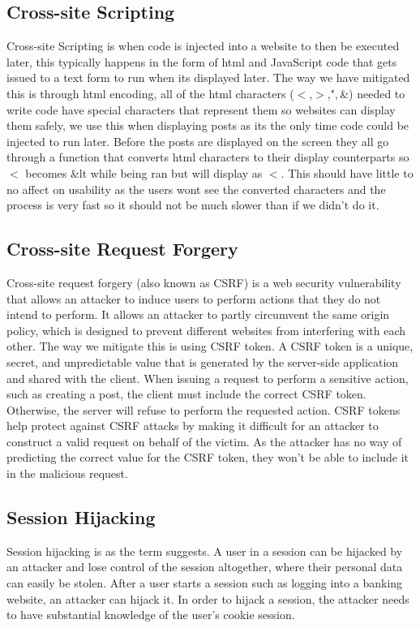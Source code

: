 \documentclass{cmpstyle}
\begin{document}
\subsection{Cross-site Scripting}
Cross-site Scripting is when code is injected into a website to then be executed later, this typically happens in the form of html and JavaScript code that gets issued to a text form to run when its displayed later. The way we have mitigated this is through html encoding, all of the html characters ($<$,$>$,",\,\&) needed to write code have special characters that represent them so websites can display them safely, we use this when displaying posts as its the only time code could be injected to run later. Before the posts are displayed on the screen they all go through a function that converts html characters to their display counterparts so $<$ becomes \&lt while being ran but will display as $<$. This should have little to no affect on usability as the users wont see the converted characters and the process is very fast so it should not be much slower than if we didn't do it.
\subsection{Cross-site Request Forgery}
Cross-site request forgery (also known as CSRF) is a web security vulnerability that allows an attacker to induce users to perform actions that they do not intend to perform. It allows an attacker to partly circumvent the same origin policy, which is designed to prevent different websites from interfering with each other. The way we mitigate this is using CSRF token. A CSRF token is a unique, secret, and unpredictable value that is generated by the server-side application and shared with the client. When issuing a request to perform a sensitive action, such as creating a post, the client must include the correct CSRF token. Otherwise, the server will refuse to perform the requested action. CSRF tokens help protect against CSRF attacks by making it difficult for an attacker to construct a valid request on behalf of the victim. As the attacker has no way of predicting the correct value for the CSRF token, they won't be able to include it in the malicious request.
\subsection{Session Hijacking}
Session hijacking is as the term suggests. A user in a session can be hijacked by an attacker and lose control of the session altogether, where their personal data can easily be stolen. After a user starts a session such as logging into a banking website, an attacker can hijack it. In order to hijack a session, the attacker needs to have substantial knowledge of the user’s cookie session. 
\end{document}
